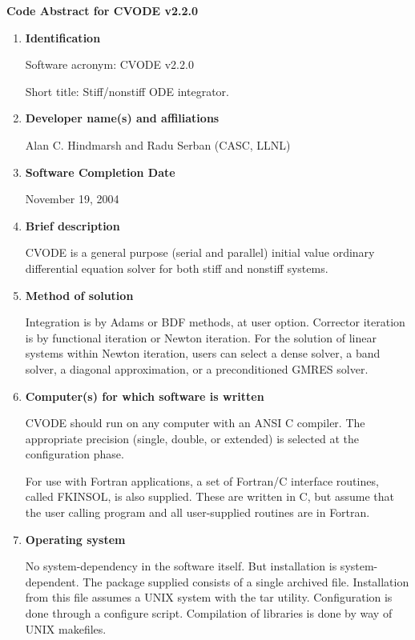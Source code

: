 \documentclass[12pt]{letter}
\begin{document}
\pagestyle{empty}

\begin{letter}

\vspace{0.2in}
\centerline{\bf Code Abstract for CVODE v2.2.0}

\begin{enumerate}

\item {\bf Identification}

Software acronym: CVODE v2.2.0

Short title: Stiff/nonstiff ODE integrator.

\item {\bf Developer name(s) and affiliations}

Alan C. Hindmarsh and Radu Serban (CASC, LLNL)

\item {\bf Software Completion Date}

November 19, 2004

\item {\bf Brief description}

CVODE is a general purpose (serial and parallel) initial value ordinary differential 
equation solver for both stiff and nonstiff systems.

\item {\bf Method of solution}

Integration is by Adams or BDF methods, at user option. Corrector iteration is by 
functional iteration or Newton iteration. For the solution of linear systems within 
Newton iteration, users can select a dense solver, a band solver, a diagonal 
approximation, or a preconditioned GMRES solver.

\item {\bf Computer(s) for which software is written}

CVODE should run on any computer with an ANSI C compiler. The appropriate 
precision (single, double, or extended) is selected at the configuration phase.

For use with Fortran applications, a set of Fortran/C interface routines,
called FKINSOL, is also supplied.  These are written in C, but assume that
the user calling program and all user-supplied routines are in Fortran.

\item {\bf Operating system}

No system-dependency in the software itself. But installation is system-dependent. 
The package supplied consists of a single archived file. Installation from this file 
assumes a UNIX system with the tar utility. Configuration is done through a 
configure script. Compilation of libraries is done by way of UNIX makefiles.


\end{enumerate}
\end{letter}
\end{document}
